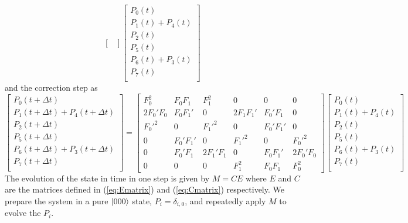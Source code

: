 \documentclass{report}
\begin{document}
\begin{appendices}
\begin{equation}
\begin{bmatrix}
    \end{bmatrix}
    \begin{bmatrix}
        P_0(t) \\
        P_1(t) + P_4(t) \\
        P_2(t) \\
        P_5(t) \\
        P_6(t)  + P_3(t)\\
        P_7(t) \\
    \end{bmatrix}
\end{equation}
and the correction step as
\begin{equation} \label{eq:Cmatrix}
    \begin{bmatrix}
        P_0(t+\Delta t) \\
        P_1(t+\Delta t) + P_4(t+\Delta t) \\
        P_2(t+\Delta t) \\
        P_5(t+\Delta t) \\
        P_6(t+\Delta t)  + P_3(t + \Delta t)\\
        P_7(t+\Delta t) \\
    \end{bmatrix}
    =
    \begin{bmatrix}
        F_0^2 & F_0 F_1 & F_1^2 & 0 & 0 & 0 \\
        2F_0'F_0 & F_0 F_1' & 0 & 2F_1 F_1' & F_0' F_1 & 0\\
        F_0'^2 & 0 & F_1'^2 & 0 & F_0' F_1' & 0 \\
        0 & F_0' F_1' & 0 & F_1'^2 & 0 &F_0'^2 \\
        0 &F_0' F_1 & 2F_1' F_1&0&F_0F_1'&2F_0'F_0 \\
        0&0&0& F_1^2 &F_0 F_1 & F_0^2
    \end{bmatrix}
    \begin{bmatrix}
        P_0(t) \\
        P_1(t) + P_4(t) \\
        P_2(t) \\
        P_5(t) \\
        P_6(t)  + P_3(t)\\
        P_7(t) \\
    \end{bmatrix}
\end{equation}
The evolution of the state in time in one step is given by $M = CE$ where $E$ and $C$ are the matrices defined in (\ref{eq:Ematrix}) and (\ref{eq:Cmatrix}) respectively. We prepare the system in a pure $\ket{000}$ state, $P_i = \delta_{i,0}$, and repeatedly apply $M$ to evolve the $P_i$.  



\end{appendices}
\end{document}
